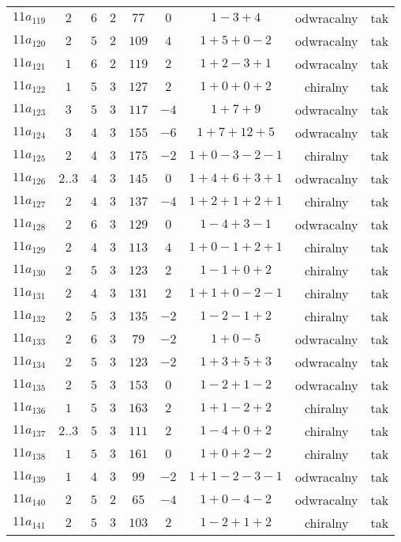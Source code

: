 \begin{longtable}{ccccccccc}
$11a_{119}$ & $2$ & $6$ & $2$ & $77$ & $0$ & $1-3+4$ & odwracalny & tak \\
$11a_{120}$ & $2$ & $5$ & $2$ & $109$ & $4$ & $1+5+0-2$ & odwracalny & tak \\
$11a_{121}$ & $1$ & $6$ & $2$ & $119$ & $2$ & $1+2-3+1$ & odwracalny & tak \\
$11a_{122}$ & $1$ & $5$ & $3$ & $127$ & $2$ & $1+0+0+2$ & chiralny & tak \\
$11a_{123}$ & $3$ & $5$ & $3$ & $117$ & $-4$ & $1+7+9$ & odwracalny & tak \\
$11a_{124}$ & $3$ & $4$ & $3$ & $155$ & $-6$ & $1+7+12+5$ & odwracalny & tak \\
$11a_{125}$ & $2$ & $4$ & $3$ & $175$ & $-2$ & $1+0-3-2-1$ & chiralny & tak \\
$11a_{126}$ & $2..3$ & $4$ & $3$ & $145$ & $0$ & $1+4+6+3+1$ & odwracalny & tak \\
$11a_{127}$ & $2$ & $4$ & $3$ & $137$ & $-4$ & $1+2+1+2+1$ & chiralny & tak \\
$11a_{128}$ & $2$ & $6$ & $3$ & $129$ & $0$ & $1-4+3-1$ & odwracalny & tak \\
$11a_{129}$ & $2$ & $4$ & $3$ & $113$ & $4$ & $1+0-1+2+1$ & chiralny & tak \\
$11a_{130}$ & $2$ & $5$ & $3$ & $123$ & $2$ & $1-1+0+2$ & chiralny & tak \\
$11a_{131}$ & $2$ & $4$ & $3$ & $131$ & $2$ & $1+1+0-2-1$ & chiralny & tak \\
$11a_{132}$ & $2$ & $5$ & $3$ & $135$ & $-2$ & $1-2-1+2$ & chiralny & tak \\
$11a_{133}$ & $2$ & $6$ & $3$ & $79$ & $-2$ & $1+0-5$ & odwracalny & tak \\
$11a_{134}$ & $2$ & $5$ & $3$ & $123$ & $-2$ & $1+3+5+3$ & odwracalny & tak \\
$11a_{135}$ & $2$ & $5$ & $3$ & $153$ & $0$ & $1-2+1-2$ & odwracalny & tak \\
$11a_{136}$ & $1$ & $5$ & $3$ & $163$ & $2$ & $1+1-2+2$ & chiralny & tak \\
$11a_{137}$ & $2..3$ & $5$ & $3$ & $111$ & $2$ & $1-4+0+2$ & chiralny & tak \\
$11a_{138}$ & $1$ & $5$ & $3$ & $161$ & $0$ & $1+0+2-2$ & chiralny & tak \\
$11a_{139}$ & $1$ & $4$ & $3$ & $99$ & $-2$ & $1+1-2-3-1$ & odwracalny & tak \\
$11a_{140}$ & $2$ & $5$ & $2$ & $65$ & $-4$ & $1+0-4-2$ & odwracalny & tak \\
$11a_{141}$ & $2$ & $5$ & $3$ & $103$ & $2$ & $1-2+1+2$ & chiralny & tak \\

\end{longtable}
